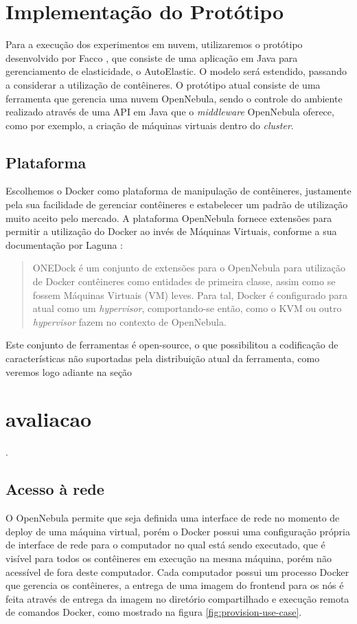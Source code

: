 \documentclass[twoside,english,brazilian]{UNISINOSartigo}
\begin{document}
\begin{itemize}
\section{Implementação do Protótipo}
\label{prototype}

Para a execução dos experimentos em nuvem, utilizaremos o protótipo desenvolvido por Facco , que consiste de uma aplicação em Java para gerenciamento de elasticidade, o AutoElastic. O modelo será estendido, passando a considerar a utilização de contêineres. O protótipo atual consiste de uma ferramenta que gerencia uma nuvem OpenNebula, sendo o controle do ambiente realizado através de uma API em Java que o \textit{middleware} OpenNebula oferece, como por exemplo, a criação de máquinas virtuais dentro do \textit{cluster}. 

\subsection{Plataforma}
Escolhemos o Docker como plataforma de manipulação de contêineres, justamente pela sua facilidade de gerenciar contêineres e estabelecer um padrão de utilização muito aceito pelo mercado. A plataforma OpenNebula fornece extensões para permitir a utilização do Docker ao invés de Máquinas Virtuais, conforme a sua documentação por Laguna :

\begin{quote}
ONEDock é um conjunto de extensões para o OpenNebula para utilização de Docker contêineres como entidades de primeira classe, assim como se fossem Máquinas Virtuais (VM) leves. Para tal, Docker é configurado para atual como um \textit{hypervisor}, comportando-se então, como o KVM ou outro \textit{hypervisor} fazem no contexto de OpenNebula.
\end{quote} 

Este conjunto de ferramentas é open-source, o que possibilitou a codificação de características não suportadas pela distribuição atual da ferramenta, como veremos logo adiante na seção \section{avaliacao}.

\subsection{Acesso à rede}
O OpenNebula permite que seja definida uma interface de rede no momento de deploy de uma máquina virtual, porém o Docker possui uma configuração própria de interface de rede para o computador no qual está sendo executado, que é visível para todos os contêineres em execução na mesma máquina, porém não acessível de fora deste computador. Cada computador possui um processo Docker que gerencia os contêineres, a entrega de uma imagem do frontend para os nós é feita através de entrega da imagem no diretório compartilhado e execução remota de comandos Docker, como mostrado na figura \ref{fig:provision-use-case}.


\end{itemize}
\end{document}
